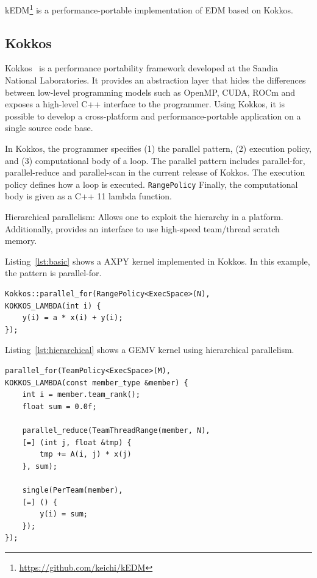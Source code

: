 \documentclass[conference]{IEEEtran}
\begin{document}
kEDM\footnote{\url{https://github.com/keichi/kEDM}} is a performance-portable
implementation of EDM based on Kokkos.

\subsection{Kokkos}

Kokkos~\cite{Edwards2014} is a performance portability framework developed at
the Sandia National Laboratories. It provides an abstraction layer that hides
the differences between low-level programming models such as OpenMP, CUDA,
ROCm and exposes a high-level C++ interface to the programmer. Using Kokkos,
it is possible to develop a cross-platform and performance-portable
application on a single source code base.

In Kokkos, the programmer specifies (1) the parallel pattern, (2) execution
policy, and (3) computational body of a loop. The parallel pattern includes
parallel-for, parallel-reduce and parallel-scan in the current release of
Kokkos. The execution policy defines how a loop is executed.
\texttt{RangePolicy}
Finally, the computational body is given as a C++ 11 lambda function.

Hierarchical parallelism: Allows one to exploit the hierarchy in a
    platform. Additionally, provides an interface to use high-speed
    team/thread scratch memory.

Listing~\ref{lst:basic} shows a AXPY kernel implemented in Kokkos.
In this example, the pattern is parallel-for.

\begin{lstlisting}[caption={Basic data parallel loop},label={lst:basic}]
Kokkos::parallel_for(RangePolicy<ExecSpace>(N),
KOKKOS_LAMBDA(int i) {
    y(i) = a * x(i) + y(i);
});
\end{lstlisting}

Listing~\ref{lst:hierarchical} shows a GEMV kernel using hierarchical
parallelism.

\begin{lstlisting}[caption={Hierarchical data parallel loop},label={lst:hierarchical}]
parallel_for(TeamPolicy<ExecSpace>(M),
KOKKOS_LAMBDA(const member_type &member) {
    int i = member.team_rank();
    float sum = 0.0f;

    parallel_reduce(TeamThreadRange(member, N),
    [=] (int j, float &tmp) {
        tmp += A(i, j) * x(j)
    }, sum);

    single(PerTeam(member),
    [=] () {
        y(i) = sum;
    });
});
\end{lstlisting}
\end{document}
